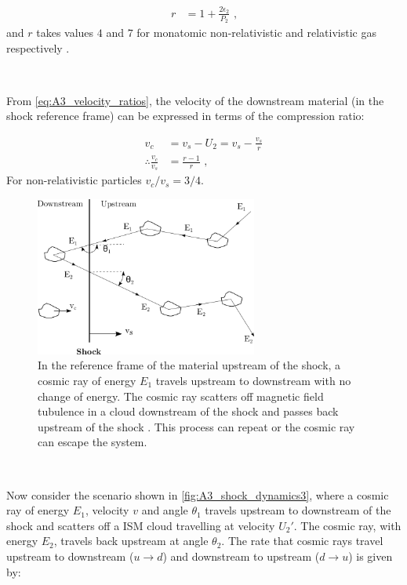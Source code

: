 \begin{equation}
    \begin{aligned}
        r&=1+\frac{2\epsilon_2}{P_2}\text{ ,}
    \end{aligned}
\end{equation}
\noindent and $r$ takes values $4$ and $7$ for monatomic non-relativistic and relativistic gas respectively  \citep{1983RPPh...46..973D}.
\par~\par 
From \autoref{eq:A3_velocity_ratios}, the velocity of the downstream material (in the shock reference frame) can be expressed in terms of the compression ratio:

\begin{equation}
    \begin{aligned}
        v_c &=v_s-U_2=v_s-\frac{v_s}{r} \\
        \therefore \frac{v_c}{v_s}&=\frac{r-1}{r}\text{ ,}
    \end{aligned} \label{eq:down_upstream_v_ratio}
\end{equation}
\noindent For non-relativistic particles ${v_c}/{v_s}=3/4$.
\begin{figure}
	\centering
	\includegraphics[width=0.65\textwidth]{A3_Diffusive_Shock_Acceleration/Images/dsa.png}
	\caption{In the reference frame of the material upstream of the shock, a cosmic ray of energy $E_1$ travels upstream to downstream with no change of energy. The cosmic ray scatters off magnetic field tubulence in a  cloud downstream of the shock and passes back upstream of the shock . This process can repeat or the cosmic ray can escape the system.}
	\label{fig:A3_shock_dynamics3}
\end{figure}
\par~\par 
Now consider the scenario shown in \autoref{fig:A3_shock_dynamics3}, where a cosmic ray of energy $E_1$, velocity $v$ and angle $\theta_1$ travels upstream to downstream of the shock and scatters off a ISM cloud travelling at velocity $U_2'$. The cosmic ray, with energy $E_2$, travels back upstream at angle $\theta_2$. The rate that cosmic rays travel upstream to downstream ($u\rightarrow d$) and downstream to upstream ($d\rightarrow u$) is given by:


